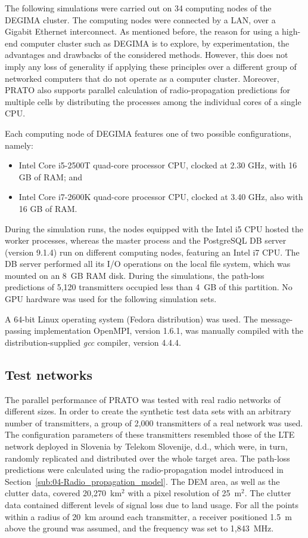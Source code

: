 The following simulations were carried out on 34 computing nodes of
the DEGIMA cluster. The computing nodes were connected by a LAN, over
a Gigabit Ethernet interconnect. As mentioned before, the reason for
using a high-end computer cluster such as DEGIMA is to explore, by
experimentation, the advantages and drawbacks of the considered methods.
However, this does not imply any loss of generality if applying these
principles over a different group of networked computers that do not
operate as a computer cluster. Moreover, PRATO also supports parallel
calculation of radio-propagation predictions for multiple cells by
distributing the processes among the individual cores of a single
CPU.

Each computing node of DEGIMA features one of two possible configurations,
namely:
\begin{itemize}
\item Intel Core i5-2500T quad-core processor CPU, clocked at 2.30 GHz,
with 16 GB of RAM; and
\item Intel Core i7-2600K quad-core processor CPU, clocked at 3.40 GHz,
also with 16 GB of RAM.
\end{itemize}
During the simulation runs, the nodes equipped with the Intel i5 CPU
hosted the worker processes, whereas the master process and the PostgreSQL
DB server (version 9.1.4) run on different computing nodes, featuring
an Intel i7 CPU. The DB server performed all its I/O operations on
the local file system, which was mounted on an 8~GB RAM disk. During
the simulations, the path-loss predictions of 5,120 transmitters occupied
less than 4~GB of this partition. No GPU hardware was used for the
following simulation sets.

A 64-bit Linux operating system (Fedora distribution) was used. The
message-passing implementation OpenMPI, version 1.6.1, was manually
compiled with the distribution-supplied \emph{gcc} compiler, version
4.4.4.


\subsection{Test networks}

The parallel performance of PRATO was tested with real radio networks
of different sizes. In order to create the synthetic test data sets
with an arbitrary number of transmitters, a group of 2,000 transmitters
of a real network was used. The configuration parameters of these
transmitters resembled those of the LTE network deployed in Slovenia
by Telekom Slovenije, d.d., which were, in turn, randomly replicated
and distributed over the whole target area. The path-loss predictions
were calculated using the radio-propagation model introduced in Section~\ref{sub:04-Radio_propagation_model}.
The DEM area, as well as the clutter data, covered 20,270~km$^{2}$
with a pixel resolution of 25~m$^{2}$. The clutter data contained
different levels of signal loss due to land usage. For all the points
within a radius of 20~km around each transmitter, a receiver positioned
1.5~m above the ground was assumed, and the frequency was set to
1,843~MHz.


